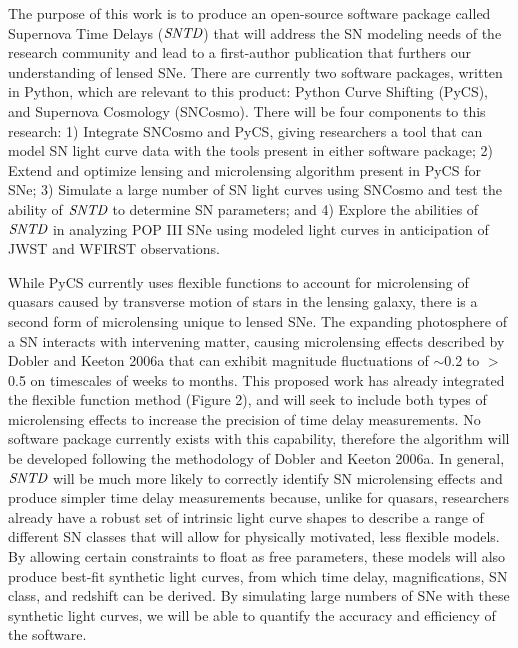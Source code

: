 The purpose of this work is to produce an open-source software
package called Supernova Time Delays ($\textit{SNTD}$) that will
address the SN modeling needs of the research community and lead to a
first-author publication that furthers our understanding of lensed
SNe. There are currently two software packages, written in Python,
which are relevant to this product: Python Curve Shifting (PyCS), and
Supernova Cosmology (SNCosmo). There will be four components to this
research: 1) Integrate SNCosmo and PyCS, giving researchers a tool
that can model SN light curve data with the tools present in either
software package; 2) Extend and optimize lensing and microlensing
algorithm present in PyCS for SNe; 3) Simulate a large number of SN
light curves using SNCosmo and test the ability of $\textit{SNTD}$ to
determine SN parameters; and 4) Explore the abilities of
$\textit{SNTD}$ in analyzing POP III SNe using modeled light curves in
anticipation of JWST and WFIRST observations.



While PyCS currently uses flexible functions to account for
microlensing of quasars caused by transverse motion of stars in the
lensing galaxy, there is a second form of microlensing unique to
lensed SNe. The expanding photosphere of a SN interacts with
intervening matter, causing microlensing effects described by Dobler
and Keeton 2006a that can exhibit magnitude fluctuations of $\sim$0.2
to $>$0.5 on timescales of weeks to months. This proposed work has
already integrated the flexible function method (Figure 2), and will
seek to include both types of microlensing effects to increase the
precision of time delay measurements. No software package currently
exists with this capability, therefore the algorithm will be developed
following the methodology of Dobler and Keeton 2006a. In general,
$\textit{SNTD}$ will be much more likely to correctly identify SN
microlensing effects and produce simpler time delay measurements
because, unlike for quasars, researchers already have a robust set of
intrinsic light curve shapes to describe a range of different SN
classes that will allow for physically motivated, less flexible
models. By allowing certain constraints to float as free parameters,
these models will also produce best-fit synthetic light curves, from
which time delay, magnifications, SN class, and redshift can be
derived. By simulating large numbers of SNe with these synthetic light
curves, we will be able to quantify the accuracy and efficiency of the
software.


